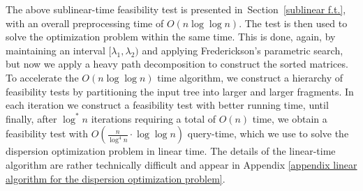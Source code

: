 \documentclass[a4paper,UKenglish]{lipics-v2016}
\theoremstyle{plain}
\begin{document}
The above sublinear-time feasibility test is presented in~Section~\ref{sublinear f.t.}, with an overall preprocessing time of $O(n\log\log n)$.
The test is then used to solve the optimization problem within the same time. This is done, again, by maintaining an interval
$[\lambda_{1},\lambda_{2})$ and applying Frederickson's parametric search, but now we apply a heavy path decomposition to construct
the sorted matrices.
To accelerate the $O(n\log\log n)$ time algorithm, we construct a hierarchy of feasibility tests by partitioning the input tree
into larger and larger fragments. In each iteration we construct a feasibility test with better running time, until finally, after $\log ^*n$ iterations requiring a total of $O(n)$ time, we obtain a feasibility test with $O(\frac{n}{\log ^4n} \cdot \log \log n)$ query-time, which we use to solve the dispersion optimization problem in linear  time. The details of the linear-time algorithm are rather technically difficult and appear in Appendix \ref{appendix linear algorithm for the dispersion optimization problem}.
\end{document}
